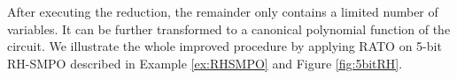 After executing the reduction, the remainder only contains a limited number of variables. It can be further 
transformed to a canonical polynomial
function of the circuit. We illustrate the whole improved procedure by applying RATO on 
5-bit RH-SMPO described in Example \ref{ex:RHSMPO} and Figure \ref{fig:5bitRH}.

